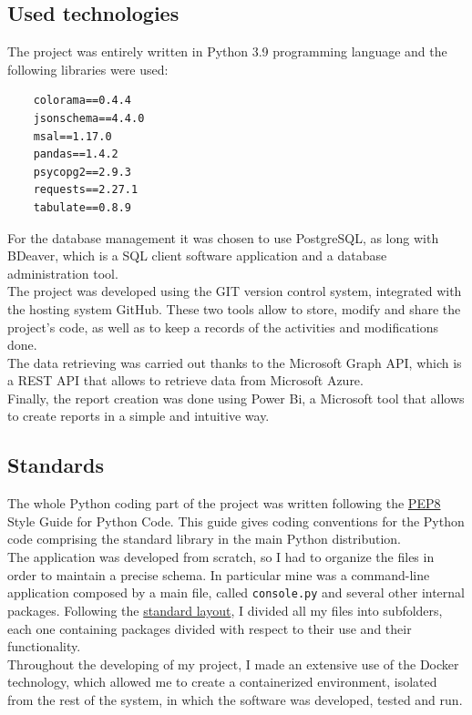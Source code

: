 \documentclass[12pt, a4paper, oneside]{article}
\begin{document}
\subsection{Used technologies}
The project was entirely written in Python 3.9 programming language and the following libraries were used:
\begin{verbatim}
    colorama==0.4.4
    jsonschema==4.4.0
    msal==1.17.0
    pandas==1.4.2   
    psycopg2==2.9.3
    requests==2.27.1
    tabulate==0.8.9
\end{verbatim}
For the database management it was chosen to use PostgreSQL, as long with BDeaver, which is a SQL client software application and a database administration tool.\\
The project was developed using the GIT version control system, integrated with the hosting system GitHub. These two tools allow to store, modify and share the project's code, as well as to keep a records
of the activities and modifications done.\\
The data retrieving was carried out thanks to the Microsoft Graph API, which is a REST API that allows to retrieve data from Microsoft Azure.\\
Finally, the report creation was done using Power Bi, a Microsoft tool that allows to create reports in a simple and intuitive way.

\newpage
\subsection{Standards}
The whole Python coding part of the project was written following the \href{https://peps.python.org/pep-0008/}{PEP8} Style Guide for Python Code.
This guide gives coding conventions for the Python code comprising the standard library in the main Python distribution.\\
The application was developed from scratch, so I had to organize the files in order to maintain a precise schema. In particular mine was a command-line application composed by a main file, called \texttt{console.py}
and several other internal packages. Following the \href{https://realpython.com/python-application-layouts/}{standard layout}, I divided all my files into subfolders, each one containing packages divided with
respect to their use and their functionality.\\
Throughout the developing of my project, I made an extensive use of the Docker technology, which allowed me to create a containerized environment, isolated from the rest of the system,
in which the software was developed, tested and run.
\end{document}
